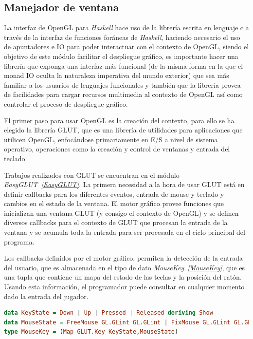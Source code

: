\subsection{Manejador de ventana}

La interfaz de OpenGL para \emph{Haskell} hace uso de la librería escrita en lenguaje c a través de la interfaz de funciones foráneas de \emph{Haskell}, haciendo necesario el uso de apuntadores e IO para poder interactuar con el contexto de OpenGL, siendo el objetivo de este módulo facilitar el despliegue gráfico, es importante hacer una librería que exponga una interfaz más funcional (de la misma forma en la que el monad IO oculta la naturaleza imperativa del mundo exterior) que sea más familiar a los usuarios de lenguajes funcionales y también que la librería provea de facilidades para cargar recursos multimedia al contexto de OpenGL así como controlar el proceso de despliegue gráfico.

El primer paso para usar OpenGL es la creación del contexto, para ello se ha elegido la librería GLUT, que es una librería de utilidades para aplicaciones que utilicen OpenGL, enfocándose primariamente en E/S a nivel de sistema operativo, operaciones como la creación y control de ventanas y entrada del teclado.

Trabajos realizados con GLUT se encuentran en el módulo \emph{EasyGLUT~\ref{EasyGLUT}}. La primera necesidad a la hora de usar GLUT está en definir callbacks para los diferentes eventos, entrada de mouse y teclado y cambios en el estado de la ventana. El motor gráfico provee funciones que inicializan una ventana GLUT (y consigo el contexto de OpenGL) y se definen diversos callbacks para el contexto de GLUT que procesan la entrada de la ventana y se acumula toda la entrada para ser procesada en el ciclo principal del programa.

Los callbacks definidos por el motor gráfico, permiten la detección de la entrada del usuario, que es almacenada en el tipo de dato \emph{MouseKey~\ref{MouseKey}}, que es una tupla que contiene un mapa del estado de las teclas y la posición del ratón. Usando esta información, el programador puede consultar en cualquier momento dado la entrada del jugador.

\begin{lstlisting}[label={MouseKey},frame=single,language=Haskell]
data KeyState = Down | Up | Pressed | Released deriving Show
data MouseState = FreeMouse GL.GLint GL.GLint | FixMouse GL.GLint GL.GLint
type MouseKey = (Map GLUT.Key KeyState,MouseState)
\end{lstlisting}

